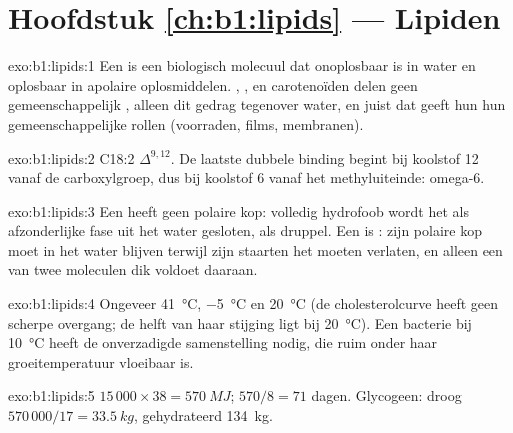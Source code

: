 \section*{Hoofdstuk \ref{ch:b1:lipids} --- Lipiden}

\begin{solution}{exo:b1:lipids:1}
Een  is een biologisch molecuul dat onoplosbaar is in water en oplosbaar in
apolaire oplosmiddelen. , ,  en carotenoïden delen geen
gemeenschappelijk , alleen dit gedrag tegenover water, en juist dat geeft
hun hun gemeenschappelijke rollen (voorraden, films, membranen).
\end{solution}

\begin{solution}{exo:b1:lipids:2}
C18:2 $\Delta^{9,12}$. De laatste dubbele binding begint bij koolstof 12 vanaf de
carboxylgroep, dus bij koolstof 6 vanaf het methyluiteinde: omega-6.
\end{solution}

\begin{solution}{exo:b1:lipids:3}
Een  heeft geen polaire kop: volledig hydrofoob wordt het als
afzonderlijke fase uit het water gesloten, als druppel. Een  is
: zijn polaire kop moet in het water blijven terwijl zijn staarten het
moeten verlaten, en alleen een  van twee moleculen dik voldoet daaraan.
\end{solution}

\begin{solution}{exo:b1:lipids:4}
Ongeveer \qty{41}{\celsius}, \qty{-5}{\celsius} en \qty{20}{\celsius} (de
cholesterolcurve heeft geen scherpe overgang; de helft van haar stijging ligt bij
\qty{20}{\celsius}). Een bacterie bij \qty{10}{\celsius} heeft de onverzadigde
samenstelling nodig, die ruim onder haar groeitemperatuur vloeibaar is.
\end{solution}

\begin{solution}{exo:b1:lipids:5}
$15\,000\times 38 = \qty{570}{MJ}$; $570/8 = 71$ dagen. Glycogeen: droog
$570\,000/17 = \qty{33.5}{kg}$, gehydrateerd \qty{134}{kg}.
\end{solution}

